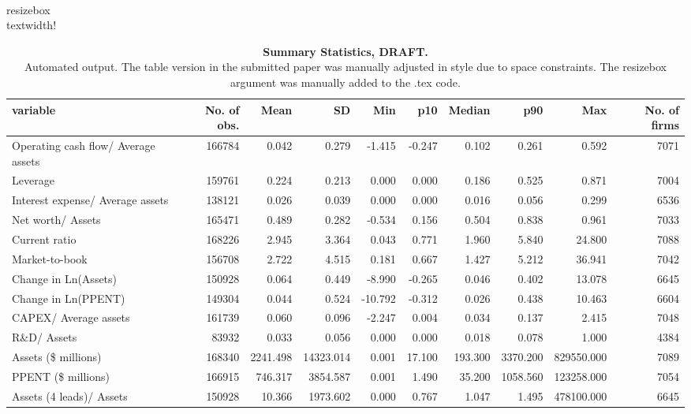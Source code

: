 \begin{table}[ht]
\centering
\caption{\textbf{Summary Statistics, DRAFT.} \\
                     Automated output. The table version in the submitted paper 
                     was manually adjusted in style due to space constraints. The resizebox{} argument 
             was manually added to the .tex code.} 
\\resizebox{\\textwidth}{!}{\begin{tabular}{lrrrrrrrrr}
  \hline
variable & No. of obs. & Mean & SD & Min & p10 & Median & p90 & Max & No. of firms \\ 
  \hline
Operating cash flow/ Average assets & 166784 & 0.042 & 0.279 & -1.415 & -0.247 & 0.102 & 0.261 & 0.592 & 7071 \\ 
  Leverage & 159761 & 0.224 & 0.213 & 0.000 & 0.000 & 0.186 & 0.525 & 0.871 & 7004 \\ 
  Interest expense/ Average assets & 138121 & 0.026 & 0.039 & 0.000 & 0.000 & 0.016 & 0.056 & 0.299 & 6536 \\ 
  Net worth/ Assets & 165471 & 0.489 & 0.282 & -0.534 & 0.156 & 0.504 & 0.838 & 0.961 & 7033 \\ 
  Current ratio & 168226 & 2.945 & 3.364 & 0.043 & 0.771 & 1.960 & 5.840 & 24.800 & 7088 \\ 
  Market-to-book & 156708 & 2.722 & 4.515 & 0.181 & 0.667 & 1.427 & 5.212 & 36.941 & 7042 \\ 
  Change in Ln(Assets) & 150928 & 0.064 & 0.449 & -8.990 & -0.265 & 0.046 & 0.402 & 13.078 & 6645 \\ 
  Change in Ln(PPENT) & 149304 & 0.044 & 0.524 & -10.792 & -0.312 & 0.026 & 0.438 & 10.463 & 6604 \\ 
  CAPEX/ Average assets & 161739 & 0.060 & 0.096 & -2.247 & 0.004 & 0.034 & 0.137 & 2.415 & 7048 \\ 
  R\&D/ Assets & 83932 & 0.033 & 0.056 & 0.000 & 0.000 & 0.018 & 0.078 & 1.000 & 4384 \\ 
  Assets (\$ millions) & 168340 & 2241.498 & 14323.014 & 0.001 & 17.100 & 193.300 & 3370.200 & 829550.000 & 7089 \\ 
  PPENT (\$ millions) & 166915 & 746.317 & 3854.587 & 0.001 & 1.490 & 35.200 & 1058.560 & 123258.000 & 7054 \\ 
  Assets (4 leads)/ Assets & 150928 & 10.366 & 1973.602 & 0.000 & 0.767 & 1.047 & 1.495 & 478100.000 & 6645 \\ 

\end{tabular}}
\end{table}
